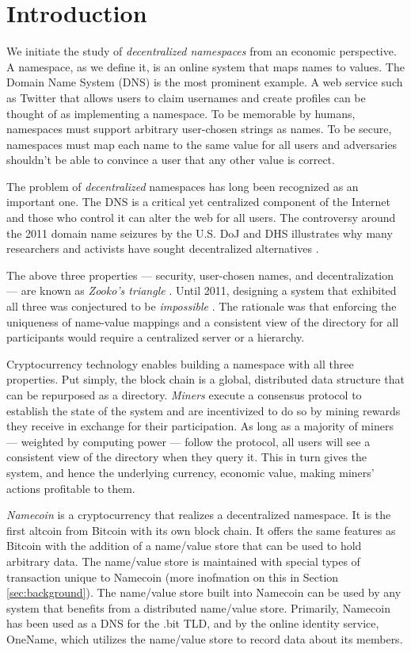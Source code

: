\section{Introduction}
\label{sec:intro}

We initiate the study of {\em decentralized namespaces} from an economic perspective. A namespace, as we define it, is an online system that maps names to values. The Domain Name System (DNS) is the most prominent example.  A web service such as Twitter that allows users to claim usernames and create profiles can be thought of as implementing a namespace. To be memorable by humans, namespaces must support arbitrary user-chosen strings as names. To be secure, namespaces must map each name to the same value for all users and adversaries shouldn't be able to convince a user that any other value is correct.

The problem of {\em decentralized} namespaces has long been recognized as an important one. The DNS is a critical yet centralized component of the Internet and those who control it can alter the web for all users. The controversy around the 2011 domain name seizures by the U.S. DoJ and DHS illustrates why many researchers and activists have sought decentralized alternatives \cite{wikileaks}.

The above three properties --- security, user-chosen names, and decentralization --- are known as {\em Zooko's triangle} \cite{zooko}. Until 2011, designing a system that exhibited all three was conjectured to be {\em impossible} \cite{square}. The rationale was that enforcing the uniqueness of name-value mappings and a consistent view of the directory for all participants would require a centralized server or a hierarchy.

Cryptocurrency technology enables building a namespace with all three properties. Put simply, the block chain is a global, distributed data structure that can be repurposed as a directory. {\em Miners} execute a consensus protocol to establish the state of the system and are incentivized to do so by mining rewards they receive in exchange for their participation. As long as a majority of miners --- weighted by computing power --- follow the protocol, all users will see a consistent view of the directory when they query it. This in turn gives the system, and hence the underlying currency, economic value, making miners' actions profitable to them.

{\em Namecoin} is a cryptocurrency that realizes a decentralized namespace. It is the first altcoin from Bitcoin with its own block chain. It offers the same features as Bitcoin with the addition of a name/value store that can be used to hold arbitrary data. The name/value store is maintained with special types of transaction unique to Namecoin (more inofmation on this in Section \ref{sec:background}). The name/value store built into Namecoin can be used by any system that benefits from a distributed name/value store. Primarily, Namecoin has been used as a DNS for the .bit TLD, and by the online identity service, OneName, which utilizes the name/value store to record data about its members.

